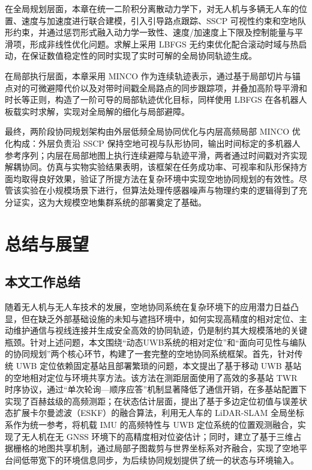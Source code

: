 在全局规划层面，本章在统一二阶积分离散动力学下，对无人机与多辆无人车的位置、速度与加速度进行联合建模，引入引导路点跟踪、SSCP 可视性约束和空地队形约束，并通过惩罚形式融入动力学一致性、速度/加速度上下限及控制能量与平滑项，形成非线性优化问题。求解上采用 L\text{-}BFGS 无约束优化配合滚动时域与热启动，在保证数值稳定性的同时实现了实时可解的全局协同轨迹生成。  

在局部执行层面，本章采用 MINCO 作为连续轨迹表示，通过基于局部切片与锚点对的可微避障代价以及对带时间戳全局路点的同步跟踪项，并叠加高阶导平滑和时长等正则，构造了一阶可导的局部轨迹优化目标，同样使用 L\text{-}BFGS 在各机器人板载实时求解，实现对全局解的细化与局部避障。  

最终，两阶段协同规划架构由外层低频全局协同优化与内层高频局部 MINCO 优化构成：外层负责沿 SSCP 保持空地可视与队形协同，输出时间标定的多机器人参考序列；内层在局部地图上执行连续避障与轨迹平滑，两者通过时间戳对齐实现解耦协同。仿真与实物实验结果表明，该框架在任务成功率、可视率和队形保持方面均取得良好效果，验证了所提方法在复杂环境中实现空地协同规划的有效性。尽管该实验在小规模场景下进行，但算法处理传感器噪声与物理约束的逻辑得到了充分证实，这为大规模空地集群系统的部署奠定了基础。

\chapter{总结与展望}

\section{本文工作总结}

随着无人机与无人车技术的发展，空地协同系统在复杂环境下的应用潜力日益凸显，但在缺乏外部基础设施的未知与遮挡环境中，如何实现高精度的相对定位、主动维护通信与视线连接并生成安全高效的协同轨迹，仍是制约其大规模落地的关键瓶颈。针对上述问题，本文围绕“动态UWB系统的相对定位”和“面向可见性与编队的协同规划”两个核心环节，构建了一套完整的空地协同系统框架。首先，针对传统 UWB 定位依赖固定基站且部署繁琐的问题，本文提出了基于移动 UWB 基站的空地相对定位与环境共享方法。该方法在测距层面使用了高效的多基站 TWR 时序协议，通过“单次轮询—顺序应答”机制显著降低了通信开销，在多基站配置下实现了百赫兹级的高频测距；在状态估计层面，提出了基于多边定位初值与误差状态扩展卡尔曼滤波（ESKF）的融合算法，利用无人车的 LiDAR-SLAM 全局坐标系作为统一参考，将机载 IMU 的高频特性与 UWB 定位系统的位置观测融合，实现了无人机在无 GNSS 环境下的高精度相对位姿估计；同时，建立了基于三维占据栅格的地图共享机制，通过局部子图裁剪与世界坐标系对齐融合，实现了空地平台间低带宽下的环境信息同步，为后续协同规划提供了统一的状态与环境输入。

